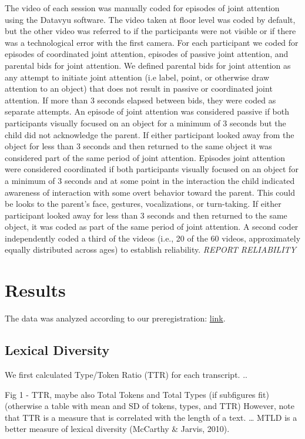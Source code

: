 \documentclass[10pt, letterpaper]{article}
\begin{document}
The video of each session was manually coded for episodes of joint
attention using the Datavyu software. The video taken at floor level was
coded by default, but the other video was referred to if the
participants were not visible or if there was a technological error with
the first camera. For each participant we coded for episodes of
coordinated joint attention, episodes of passive joint attention, and
parental bids for joint attention. We defined parental bids for joint
attention as any attempt to initiate joint attention (i.e label, point,
or otherwise draw attention to an object) that does not result in
passive or coordinated joint attention. If more than 3 seconds elapsed
between bids, they were coded as separate attempts. An episode of joint
attention was considered passive if both participants visually focused
on an object for a minimum of 3 seconds but the child did not
acknowledge the parent. If either participant looked away from the
object for less than 3 seconds and then returned to the same object it
was considered part of the same period of joint attention. Episodes
joint attention were considered coordinated if both participants
visually focused on an object for a minimum of 3 seconds and at some
point in the interaction the child indicated awareness of interaction
with some overt behavior toward the parent. This could be looks to the
parent's face, gestures, vocalizations, or turn-taking. If either
participant looked away for less than 3 seconds and then returned to the
same object, it was coded as part of the same period of joint attention.
A second coder independently coded a third of the videos (i.e., 20 of
the 60 videos, approximately equally distributed across ages) to
establish reliability. \emph{REPORT RELIABILITY}

\section{Results}\label{results}

The data was analyzed according to our preregistration:
\href{https://osf.io/2bpdf/}{link}.

\subsection{Lexical Diversity}\label{lexical-diversity}

We first calculated Type/Token Ratio (TTR) for each transcript. ..

Fig 1 - TTR, maybe also Total Tokens and Total Types (if subfigures fit)
(otherwise a table with mean and SD of tokens, types, and TTR) However,
note that TTR is a measure that is correlated with the length of a text.
\ldots{} MTLD is a better measure of lexical diversity (McCarthy \&
Jarvis, 2010).
\end{document}
